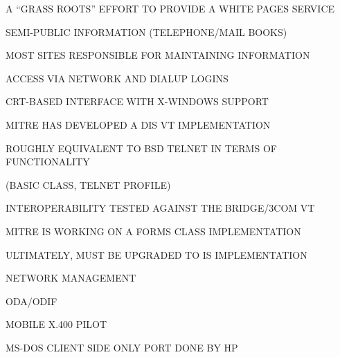 \begin{bwslide}

\begin{nrtc}
\item	A ``GRASS ROOTS'' EFFORT TO PROVIDE A WHITE PAGES SERVICE

\item	SEMI-PUBLIC INFORMATION (TELEPHONE/MAIL BOOKS)

\item	MOST SITES RESPONSIBLE FOR MAINTAINING INFORMATION

\item	ACCESS VIA NETWORK AND DIALUP LOGINS

\item	CRT-BASED INTERFACE WITH X-WINDOWS SUPPORT
\end{nrtc}
\end{bwslide}


\begin{bwslide}

\begin{nrtc}
\item	MITRE HAS DEVELOPED A DIS VT IMPLEMENTATION

\item	ROUGHLY EQUIVALENT TO BSD TELNET IN TERMS OF FUNCTIONALITY
    \begin{nrtc}
    \item	(BASIC CLASS, TELNET PROFILE)
    \end{nrtc}

\item	INTEROPERABILITY TESTED AGAINST THE BRIDGE/3COM VT

\item	MITRE IS WORKING ON A FORMS CLASS IMPLEMENTATION

\item	ULTIMATELY, MUST BE UPGRADED TO IS IMPLEMENTATION
\end{nrtc}
\end{bwslide}


\begin{bwslide}

\begin{nrtc}
\item	NETWORK MANAGEMENT

\item	ODA/ODIF

\item	MOBILE X.400 PILOT
    \begin{nrtc}
    \item	MS-DOS CLIENT SIDE ONLY PORT DONE BY HP
    \end{nrtc}
\end{nrtc}
\end{bwslide}


